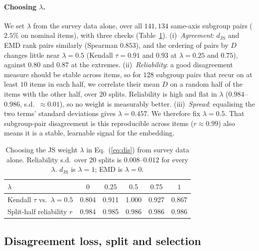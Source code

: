 \documentclass[11pt]{article}
\begin{document}
\paragraph{Choosing $\lambda$.} We set $\lambda$ from the survey data alone,
over all $141{,}134$ same-axis subgroup pairs ($2.5\%$ on nominal items), with
three checks (Table~\ref{tab:lambda}). (i)~\emph{Agreement}: $d_{\mathrm{JS}}$
and EMD rank pairs similarly (Spearman $0.853$), and the ordering of pairs by
$D$ changes little near $\lambda = 0.5$ (Kendall $\tau = 0.91$ and $0.93$ at
$\lambda = 0.25$ and $0.75$), against $0.80$ and $0.87$ at the extremes.
(ii)~\emph{Reliability}: a good disagreement measure should be stable across
items, so for $128$ subgroup pairs that recur on at least $10$ items in each
half, we correlate their mean $D$ on a random half of the items with the other
half, over $20$ splits. Reliability is high and flat in $\lambda$
($0.984$--$0.986$, s.d.\ $\approx 0.01$), so no weight is measurably better.
(iii)~\emph{Spread}: equalising the two terms' standard deviations gives
$\lambda = 0.457$. We therefore fix $\lambda = 0.5$. That subgroup-pair
disagreement is this reproducible across items ($r \approx 0.99$) also means it
is a stable, learnable signal for the embedding.

\begin{table}[t]
\centering
\small
\begin{tabular}{@{}lccccc@{}}
\toprule
$\lambda$ & $0$ & $0.25$ & $0.5$ & $0.75$ & $1$ \\
\midrule
Kendall $\tau$ vs.\ $\lambda{=}0.5$ & 0.804 & 0.911 & 1.000 & 0.927 & 0.867 \\
Split-half reliability $r$ & 0.984 & 0.985 & 0.986 & 0.986 & 0.986 \\
\bottomrule
\end{tabular}
\caption{Choosing the JS weight $\lambda$ in Eq.~(\ref{eq:dis}) from survey data
alone. Reliability s.d.\ over 20 splits is $0.008$--$0.012$ for every $\lambda$.
$d_{\mathrm{JS}}$ is $\lambda = 1$; EMD is $\lambda = 0$.}
\label{tab:lambda}
\end{table}

\subsection{Disagreement loss, split and selection}
\end{document}
